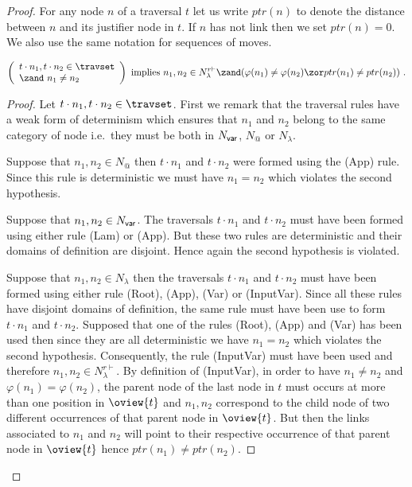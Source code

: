 \begin{proof}
For any node $n$ of a traversal $t$ let us write $ptr(n)$ to denote the distance between $n$ and its justifier node in $t$. If $n$ has not link then we set $ptr(n)=0$. We also use the same notation for sequences of moves.

\begin{lemma}
\label{lem:varphiinjective:prelem}
\begin{equation}
\left(
  \begin{array}{ll}
    t \cdot n_1, t \cdot n_2 \in \travset \\
    \zand\ n_1 \neq n_2
  \end{array}
\right)
 \mbox{ implies } n_1,n_2 \in N^{r\vdash}_{\lambda} \zand ( \varphi(n_1) \neq \varphi(n_2) \zor ptr(n_1) \neq ptr(n_2) ) \ . \end{equation}
\end{lemma}
\begin{proof}
Let $t \cdot n_1, t \cdot n_2 \in \travset$.
First we remark that the traversal rules have a weak form of determinism which ensures that $n_1$ and $n_2$ belong to the same category of node i.e.\ they must be both in $N_{\sf var}$, $N_@$ or $N_\lambda$.

Suppose that $n_1, n_2 \in N_@$ then $t \cdot n_1$ and $t \cdot n_2$ were formed using the (App) rule. Since this rule is deterministic we must have $n_1=n_2$ which violates the second hypothesis.


Suppose that $n_1,n_2\in N_{\sf var}$. The traversals $t \cdot n_1$ and $t \cdot n_2$ must have been formed using either rule (Lam) or (App). But these two rules are deterministic and their domains of definition are disjoint. Hence again the second hypothesis is violated.

Suppose that $n_1,n_2\in N_\lambda$ then
the traversals $t \cdot n_1$ and $t \cdot n_2$ must have been formed using either rule (Root), (App), (Var) or (InputVar). Since all these rules have disjoint domains of definition, the same rule must have been use to form $t \cdot n_1$ and $t \cdot n_2$. Supposed that one of the rules (Root), (App) and (Var) has been used then since they are all deterministic we have $n_1=n_2$ which violates the second hypothesis. Consequently, the rule (InputVar) must have been used and therefore $n_1,n_2 \in N_\lambda^{r\vdash}$. By definition of (InputVar), in order to have $n_1\neq n_2$ and $\varphi(n_1) = \varphi(n_2)$, the parent node of the last node in $t$ must occurs at more than one position in $\oview{t}$ and $n_1,n_2$ correspond to the child node of two different occurrences of that parent node in $\oview{t}$. But then the links associated to $n_1$ and $n_2$ will point to their respective occurrence of that parent node in $\oview{t}$ hence $ptr(n_1) \neq ptr(n_2)$.
\end{proof}


\end{proof}
